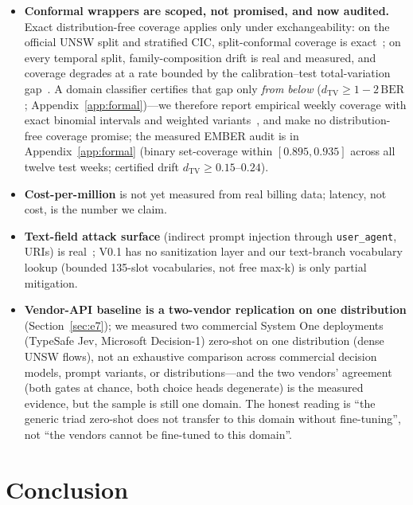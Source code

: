 \documentclass[sigconf,anonymous=false]{acmart}
\begin{document}
\begin{itemize}
\item \textbf{Conformal wrappers are scoped, not promised, and now audited.} Exact distribution-free coverage applies only under exchangeability: on the official UNSW split and stratified CIC, split-conformal coverage is exact~\cite{papadopoulos2002,tibshirani2019}; on every temporal split, family-composition drift is real and measured, and coverage degrades at a rate bounded by the calibration--test total-variation gap~\cite{barber2023}. A domain classifier certifies that gap only \emph{from below} ($d_{\mathrm{TV}} \ge 1-2\,\mathrm{BER}$; Appendix~\ref{app:formal})---we therefore report empirical weekly coverage with exact binomial intervals and weighted variants~\cite{tibshirani2019}, and make no distribution-free coverage promise; the measured EMBER audit is in Appendix~\ref{app:formal} (binary set-coverage within $[0.895,0.935]$ across all twelve test weeks; certified drift $d_{\mathrm{TV}} \ge 0.15$--$0.24$).

\item \textbf{Cost-per-million} is not yet measured from real billing data; latency, not cost, is the number we claim.

\item \textbf{Text-field attack surface} (indirect prompt injection through \texttt{user\_agent}, URIs) is real~\cite{greshake2023injection}; V0.1 has no sanitization layer and our text-branch vocabulary lookup (bounded 135-slot vocabularies, not free max-k) is only partial mitigation.

\item \textbf{Vendor-API baseline is a two-vendor replication on one distribution} (Section~\ref{sec:e7}); we measured two commercial System One deployments (TypeSafe Jev, Microsoft Decision-1) zero-shot on one distribution (dense UNSW flows), not an exhaustive comparison across commercial decision models, prompt variants, or distributions---and the two vendors' agreement (both gates at chance, both choice heads degenerate) is the measured evidence, but the sample is still one domain. The honest reading is ``the generic triad zero-shot does not transfer to this domain without fine-tuning'', not ``the vendors cannot be fine-tuned to this domain''.
\end{itemize}

\section{Conclusion}
\label{sec:conclusion}
\end{document}
